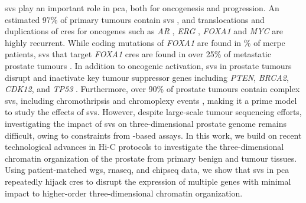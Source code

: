 \glspl{sv} play an important role in \gls{pca}, both for oncogenesis and progression.
An estimated 97\% of primary tumours contain \glspl{sv} \cite{liPatternsSomaticStructural2020,fraserGenomicHallmarksLocalized2017}, and translocations and duplications of \glspl{cre} for oncogenes such as \emph{AR} \cite{takedaSomaticallyAcquiredEnhancer2018}, \emph{ERG} \cite{rosenClinicalPotentialERG2012}, \emph{FOXA1} \cite{quigleyGenomicHallmarksStructural2018,paroliaDistinctStructuralClasses2019} and \emph{MYC} \cite{paroliaDistinctStructuralClasses2019} are highly recurrent.
While coding mutations of \emph{FOXA1} are found in \% of \gls{mcrpc} patients, \glspl{sv} that target \emph{FOXA1} \glspl{cre} are found in over 25\% of metastatic prostate tumours \cite{paroliaDistinctStructuralClasses2019}.
In addition to oncogenic activation, \glspl{sv} in prostate tumours disrupt and inactivate key tumour suppressor genes including \emph{PTEN}, \emph{BRCA2}, \emph{CDK12}, and \emph{TP53} \cite{quigleyGenomicHallmarksStructural2018,abeshouseMolecularTaxonomyPrimary2015}.
Furthermore, over 90\% of prostate tumours contain complex \glspl{sv}, including chromothripsis and chromoplexy events \cite{bacaPunctuatedEvolutionProstate2013}, making it a prime model to study the effects of \glspl{sv}.
However, despite large-scale tumour sequencing efforts, investigating the impact of \glspl{sv} on three-dimensional prostate genome remains difficult, owing to constraints from -based assays.
In this work, we build on recent technological advances in Hi-C protocols to investigate the three-dimensional chromatin organization of the prostate from primary benign and tumour tissues.
Using patient-matched \gls{wgs}, \gls{rnaseq}, and \gls{chipseq} data, we show that \glspl{sv} in \gls{pca} repeatedly hijack \glspl{cre} to disrupt the expression of multiple genes with minimal impact to higher-order three-dimensional chromatin organization.
